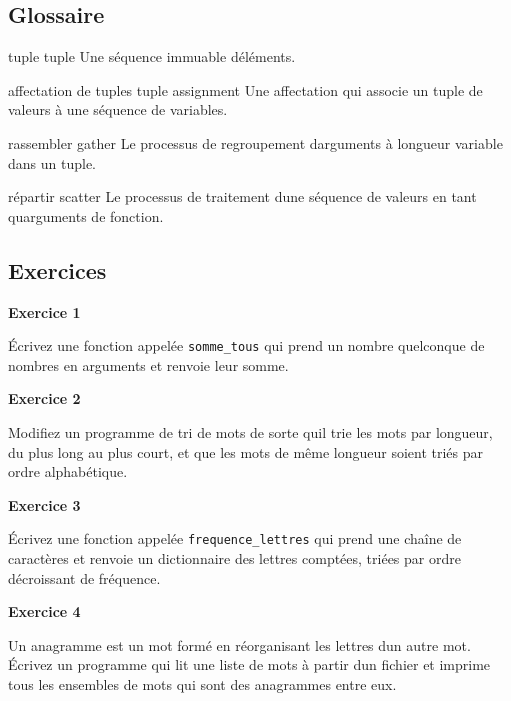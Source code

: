 \hypertarget{glossaire}{%
\subsection{Glossaire}\label{glossaire}}

tuple tuple Une séquence immuable d\textquotesingle éléments.

affectation de tuples tuple assignment Une affectation qui associe un
tuple de valeurs à une séquence de variables.

rassembler gather Le processus de regroupement
d\textquotesingle arguments à longueur variable dans un tuple.

répartir scatter Le processus de traitement d\textquotesingle une
séquence de valeurs en tant qu\textquotesingle arguments de fonction.

\hypertarget{exercices}{%
\subsection{Exercices}\label{exercices}}

\textbf{Exercice 1}

Écrivez une fonction appelée \texttt{somme\_tous} qui prend un nombre
quelconque de nombres en arguments et renvoie leur somme.

\textbf{Exercice 2}

Modifiez un programme de tri de mots de sorte qu\textquotesingle il trie
les mots par longueur, du plus long au plus court, et que les mots de
même longueur soient triés par ordre alphabétique.

\textbf{Exercice 3}

Écrivez une fonction appelée \texttt{frequence\_lettres} qui prend une
chaîne de caractères et renvoie un dictionnaire des lettres comptées,
triées par ordre décroissant de fréquence.

\textbf{Exercice 4}

Un anagramme est un mot formé en réorganisant les lettres
d\textquotesingle un autre mot. Écrivez un programme qui lit une liste
de mots à partir d\textquotesingle un fichier et imprime tous les
ensembles de mots qui sont des anagrammes entre eux.
